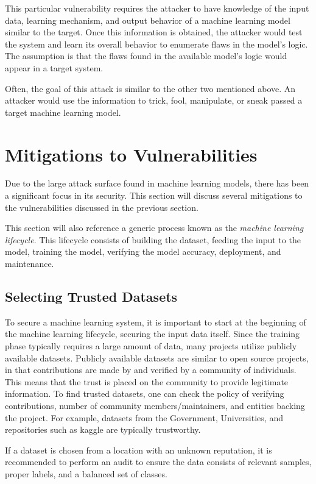 \documentclass[11pt,conference]{IEEEtran}
\begin{document}
This particular vulnerability requires the attacker to have knowledge of the
input data, learning mechanism, and output behavior of a machine learning model
similar to the target. Once this information is obtained, the attacker would
test the system and learn its overall behavior to enumerate flaws in the
model's logic. The assumption is that the flaws found in the available model's
logic would appear in a target system.

Often, the goal of this attack is similar to the other two mentioned above. An
attacker would use the information to trick, fool, manipulate, or sneak passed
a target machine learning model.

\section{Mitigations to Vulnerabilities}

Due to the large attack surface found in machine learning models, there has
been a significant focus in its security. This section will
discuss several mitigations to the vulnerabilities discussed in the previous
section. 

This section will also reference a generic process known as the \emph{machine
learning lifecycle}. This lifecycle consists of building the dataset, feeding
the input to the model, training the model, verifying the model accuracy,
deployment, and maintenance.

\subsection{Selecting Trusted Datasets}
To secure a machine learning system, it is important to start at the beginning
of the machine learning lifecycle, securing the input data itself. Since
the training phase typically requires a large amount of data,
many projects utilize publicly available datasets. Publicly available datasets
are similar to open source projects, in that contributions are made by and
verified by a community of individuals. This means that the trust is placed on
the community to provide legitimate information. To find trusted datasets, one
can check the policy of verifying contributions, number of community
members/maintainers, and entities backing the project. For example, datasets
from the Government, Universities, and repositories such as kaggle are
typically trustworthy.

If a dataset is chosen from a location with an unknown reputation, it is
recommended to perform an audit to ensure the data consists of relevant
samples, proper labels, and a balanced set of classes.
\end{document}
